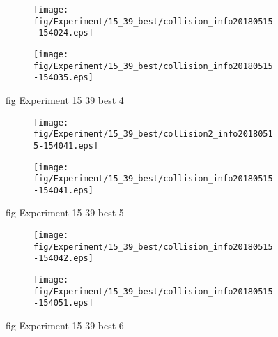 \begin{figure}[H]
	\centering
	\begin{subfigure}[b]{0.9\textwidth}
		\texttt{[image: fig/Experiment/15\_39\_best/collision\_info20180515-154024.eps]}
		\caption{}
		\label{fig:Experiment:15_39_best:collision_info20180515-154024}
	\end{subfigure}

	\begin{subfigure}[b]{0.9\textwidth}
		\texttt{[image: fig/Experiment/15\_39\_best/collision\_info20180515-154035.eps]}
		\caption{}
		\label{fig:Experiment:15_39_best:collision_info20180515-154035}
	\end{subfigure}
	\caption{fig Experiment 15 39 best 4}
	\label{fig:Experiment:15_39_best:4}
\end{figure}

\begin{figure}[H]
	\centering
	\begin{subfigure}[b]{0.9\textwidth}
		\texttt{[image: fig/Experiment/15\_39\_best/collision2\_info20180515-154041.eps]}
		\caption{}
		\label{fig:Experiment:15_39_best:collision2_info20180515-154041}
	\end{subfigure}

	\begin{subfigure}[b]{0.9\textwidth}
		\texttt{[image: fig/Experiment/15\_39\_best/collision\_info20180515-154041.eps]}
		\caption{}
		\label{fig:Experiment:15_39_best:collision_info20180515-154041}
	\end{subfigure}
	\caption{fig Experiment 15 39 best 5}
	\label{fig:Experiment:15_39_best:5}
\end{figure}

\begin{figure}[H]
	\centering
	\begin{subfigure}[b]{0.9\textwidth}
		\texttt{[image: fig/Experiment/15\_39\_best/collision\_info20180515-154042.eps]}
		\caption{}
		\label{fig:Experiment:15_39_best:collision_info20180515-154042}
	\end{subfigure}

	\begin{subfigure}[b]{0.9\textwidth}
		\texttt{[image: fig/Experiment/15\_39\_best/collision\_info20180515-154051.eps]}
		\caption{}
		\label{fig:Experiment:15_39_best:collision_info20180515-154051}
	\end{subfigure}
	\caption{fig Experiment 15 39 best 6}
	\label{fig:Experiment:15_39_best:6}
\end{figure}

